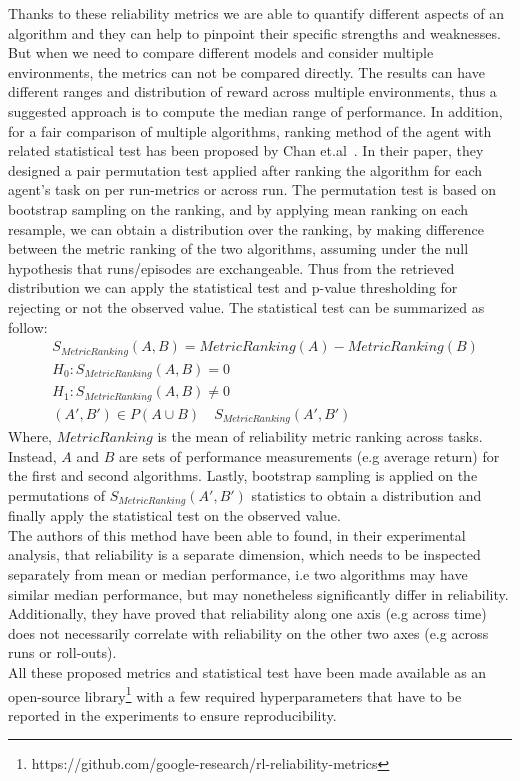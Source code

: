 \documentclass{article}
\begin{document}
Thanks to these reliability metrics we are able to quantify different aspects of an algorithm and they can help to pinpoint their specific strengths and weaknesses. But when we need to compare different models and consider multiple environments, the metrics can not be compared directly.
The results can have different ranges and distribution of reward across multiple environments, thus a suggested approach is to compute the median range of performance. In addition, for a fair comparison of multiple algorithms, ranking method of the agent with related statistical test has been proposed by Chan et.al~\cite{GoogleMeasure}. In their paper, they designed a pair permutation test applied after ranking the algorithm for each agent's task on per run-metrics or across run. The permutation test is based on bootstrap sampling on the ranking, and by applying mean ranking on each resample, we can obtain a distribution over the ranking, by making difference between the metric ranking of the two algorithms, assuming under the null hypothesis that runs/episodes are exchangeable. Thus from the retrieved distribution we can apply the statistical test and p-value thresholding for rejecting or not the observed value. The statistical test can be summarized as follow:
\begin{equation}
\begin{split}
	&S_{MetricRanking}(A, B) = MetricRanking (A) - MetricRanking (B) \\
	&H_0 : S_{MetricRanking}(A, B) =  0 \\
	&H_1 : S_{MetricRanking}(A, B) \neq  0 \\
	&(A', B')\in P (A \cup B) \quad S_{MetricRanking}(A', B')
\end{split}
\end{equation}
Where, $MetricRanking$ is the mean of reliability metric ranking across tasks. Instead, $A$ and $B$ are sets of performance measurements (e.g average return) for the first and second algorithms. Lastly, bootstrap sampling is applied on the permutations of $ S_{MetricRanking}(A', B')$ statistics to obtain a distribution and finally apply the statistical test on the observed value.\\
The authors of this method have been able to found, in their experimental analysis, that reliability is a separate dimension, which needs to be inspected separately from mean or median performance, i.e two algorithms may have similar median performance, but may nonetheless significantly differ in reliability. Additionally, they have proved that reliability along one axis (e.g across time) does not necessarily correlate with reliability on the other two axes (e.g across runs or roll-outs).\\
All these proposed metrics and statistical test have been made available as an open-source library\footnote{https://github.com/google-research/rl-reliability-metrics} with a few required hyperparameters that have to be reported in the experiments to ensure reproducibility.
\label{gen_inst}
\end{document}
